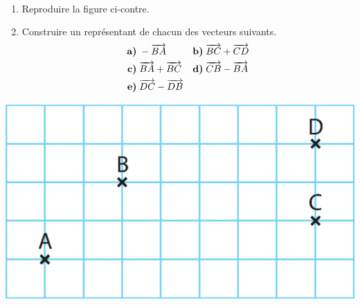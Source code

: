 \documentclass[11pt]{article}
\begin{document}
\begin{exo}~\\[-4mm]
  \begin{minipage}[]{.4\textwidth}
    \begin{enumerate}
      \item Reproduire la figure ci-contre.
      \item Construire un représentant de chacun des vecteurs suivants.
        \begin{align*}
          \textbf{a)}\;& -\overrightarrow{BA} &
          \textbf{b)}\;& \overrightarrow{BC}+\overrightarrow{CD} \\
          \textbf{c)}\;& \overrightarrow{BA}+\overrightarrow{BC} &
          \textbf{d)}\;& \overrightarrow{CB}-\overrightarrow{BA} \\
          \textbf{e)}\;& \overrightarrow{DC}-\overrightarrow{DB} &
          &
        \end{align*}
    \end{enumerate}
  \end{minipage}
  \begin{minipage}[]{.6\textwidth}
    \begin{center}
      \includegraphics[scale=.25]{quad1.png}
    \end{center}
  \end{minipage}
\end{exo}
\end{document}
